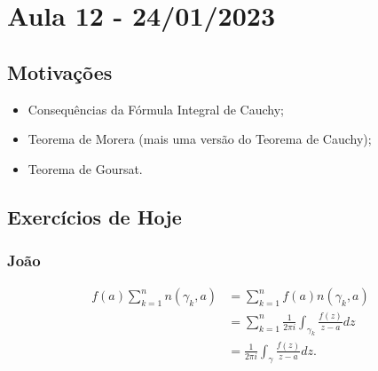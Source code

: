 \documentclass[complex.tex]{subfiles}
\begin{document}
\section{Aula 12 - 24/01/2023}
\subsection{Motivações}
\begin{itemize}
	\item Consequências da Fórmula Integral de Cauchy;
	\item Teorema de Morera (mais uma versão do Teorema de Cauchy);
	\item Teorema de Goursat.
\end{itemize}
\subsection{Exercícios de Hoje}
\subsubsection{João}
\begin{align*}
	f(a)\sum\limits_{k=1}^{n}n(\gamma_{k}, a) & = \sum\limits_{k=1}^{n}f(a)n(\gamma_{k}, a)                                   \\
	                                          & = \sum\limits_{k=1}^{n}\frac{1}{2\pi i}\int_{\gamma_{k}}^{}\frac{f(z)}{z-a}dz \\
	                                          & = \frac{1}{2\pi i}\int_{\gamma}^{}\frac{f(z)}{z-a}dz.
\end{align*}
\end{document}
